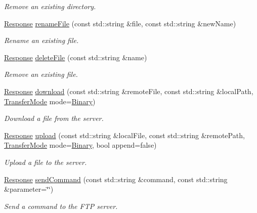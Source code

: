\begin{DoxyCompactItemize}
\begin{DoxyCompactList}\small\item\em Remove an existing directory. \end{DoxyCompactList}\item 
\mbox{\hyperlink{classsf_1_1_ftp_1_1_response}{Response}} \mbox{\hyperlink{classsf_1_1_ftp_a8f99251d7153e1dc26723e4006deb764}{rename\+File}} (const std\+::string \&file, const std\+::string \&new\+Name)
\begin{DoxyCompactList}\small\item\em Rename an existing file. \end{DoxyCompactList}\item 
\mbox{\hyperlink{classsf_1_1_ftp_1_1_response}{Response}} \mbox{\hyperlink{classsf_1_1_ftp_a8aa272b0eb7769a850006e70fcad370f}{delete\+File}} (const std\+::string \&name)
\begin{DoxyCompactList}\small\item\em Remove an existing file. \end{DoxyCompactList}\item 
\mbox{\hyperlink{classsf_1_1_ftp_1_1_response}{Response}} \mbox{\hyperlink{classsf_1_1_ftp_a20c1600ec5fd6f5a2ad1429ab8aa5df4}{download}} (const std\+::string \&remote\+File, const std\+::string \&local\+Path, \mbox{\hyperlink{classsf_1_1_ftp_a1cd6b89ad23253f6d97e6d4ca4d558cb}{Transfer\+Mode}} mode=\mbox{\hyperlink{classsf_1_1_ftp_a1cd6b89ad23253f6d97e6d4ca4d558cba6f253b362639fb5e059dc292762a21ee}{Binary}})
\begin{DoxyCompactList}\small\item\em Download a file from the server. \end{DoxyCompactList}\item 
\mbox{\hyperlink{classsf_1_1_ftp_1_1_response}{Response}} \mbox{\hyperlink{classsf_1_1_ftp_a0402d2cec27a197ffba34c88ffaddeac}{upload}} (const std\+::string \&local\+File, const std\+::string \&remote\+Path, \mbox{\hyperlink{classsf_1_1_ftp_a1cd6b89ad23253f6d97e6d4ca4d558cb}{Transfer\+Mode}} mode=\mbox{\hyperlink{classsf_1_1_ftp_a1cd6b89ad23253f6d97e6d4ca4d558cba6f253b362639fb5e059dc292762a21ee}{Binary}}, bool append=false)
\begin{DoxyCompactList}\small\item\em Upload a file to the server. \end{DoxyCompactList}\item 
\mbox{\hyperlink{classsf_1_1_ftp_1_1_response}{Response}} \mbox{\hyperlink{classsf_1_1_ftp_a44e095103ecbce175a33eaf0820440ff}{send\+Command}} (const std\+::string \&command, const std\+::string \&parameter=\char`\"{}\char`\"{})
\begin{DoxyCompactList}\small\item\em Send a command to the F\+TP server. \end{DoxyCompactList}\end{DoxyCompactItemize}

